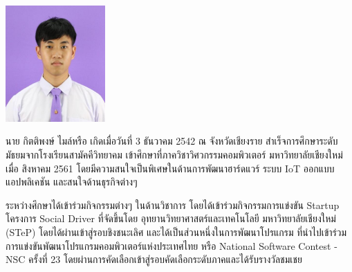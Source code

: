 \documentclass[semifinal]{cpecmu}
\begin{document}
\begin{biosketch}
\begin{center}
  \includegraphics[width=1.5in]{pic/ToonImg.jpg}  
\end{center}
นาย กิตติพงษ์ ไมล์หรือ เกิดเมื่อวันที่ 3 ธันวาคม 2542 ณ จังหวัดเชียงราย สำเร็จการศึกษาระดับมัธยมจากโรงเรียนสามัคคีวิทยาคม เข้าศึกษาที่ภาควิชาวิศวกรรมคอมพิวเตอร์ มหาวิทยาลัยเชียงใหม่ เมื่อ สิงหาคม 2561 โดยมีความสนใจเป็นพิเศษในด้านการพัฒนาฮาร์ดแวร์ ระบบ IoT ออกแบบแอปพลิเคชัน และสนใจด้านธุรกิจต่างๆ

ระหว่างศึกษาได้เข้าร่วมกิจกรรมต่างๆ ในด้านวิชาการ  โดยได้เข้าร่วมกิจกรรมการแข่งขัน Startup โครงการ Social Driver ที่จัดขึ้นโดย อุทยานวิทยาศาสตร์และเทคโนโลยี มหาวิทยาลัยเชียงใหม่ (STeP) โดยได้ผ่านเข้าสู่รอบชิงชนะเลิศ และได้เป็นส่วนหนึ่งในการพัฒนาโปรแกรม ที่นำไปเข้าร่วมการแข่งขันพัฒนาโปรแกรมคอมพิวเตอร์แห่งประเทศไทย
หรือ National Software Contest - NSC ครั้งที่ 23 โดยผ่านการคัดเลือกเข้าสู่รอบคัดเลือกระดับภาคและได้รับรางวัลชมเชย
\end{biosketch}
\fi %
\end{document}
